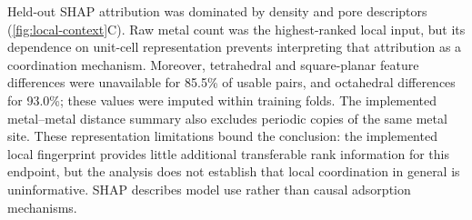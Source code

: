 {Held-out SHAP attribution was dominated by density and pore descriptors
(\cref{fig:local-context}C). Raw metal count was the highest-ranked local input,
but its dependence on unit-cell representation prevents interpreting that
attribution as a coordination mechanism. Moreover, tetrahedral and square-planar
feature differences were unavailable for 85.5\% of usable pairs, and octahedral
differences for 93.0\%; these values were imputed within training folds. The
implemented metal--metal distance summary also excludes periodic copies of the
same metal site. These representation limitations bound the conclusion: the
implemented local fingerprint provides little additional transferable rank
information for this endpoint, but the analysis does not establish that local
coordination in general is uninformative. SHAP describes model use rather than
causal adsorption mechanisms.


}

